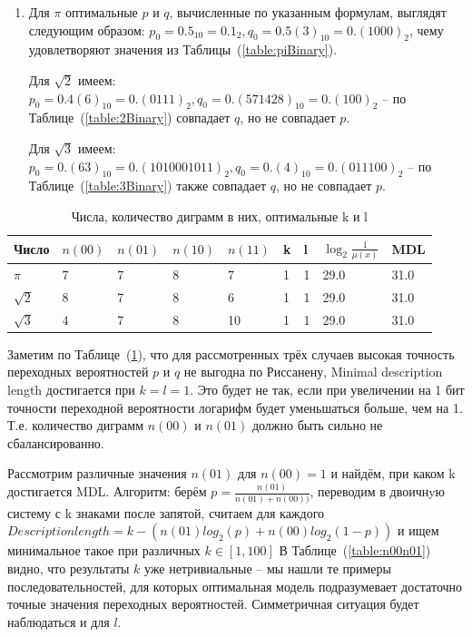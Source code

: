 \documentclass[12pt]{article}
\begin{document}
\begin{enumerate}
	
	
	\item Для $\pi$ оптимальные $p$ и $q$, вычисленные по указанным формулам, выглядят следующим образом: $p_0=0.5_{10} = 0.1_2, q_0=0.5(3)_{10}=0.(1000)_2$, чему удовлетворяют значения из Таблицы~(\ref{table:piBinary}). %
	
	Для $\sqrt{2}$ имеем: $p_0=0.4(6)_{10}=0.(0111)_2, q_0=0.(571428)_{10}=0.(100)_2$ -- по Таблице~(\ref{table:2Binary}) совпадает $q$, но не совпадает $p$.
	
	Для $\sqrt{3}$ имеем: $p_0=0.(63)_{10}=0.(1010001011)_2, q_0=0.(4)_{10}=0.(011100)_2$ -- по Таблице~(\ref{table:3Binary}) также совпадает $q$, но не совпадает $p$.
	\end{enumerate}
	
	\begin{table}[!h]
		\caption{Числа, количество диграмм в них, оптимальные k и l}
		\label{table:digramsPi23}
		\begin{center}
			\begin{tabular}{|l|l|l|l|l|l|l|l|l|}
			\hline
			Число & $n(00)$ & $n(01)$ & $n(10)$ & $n(11)$ & k & l & $\log_2{\frac{1}{\mu(x)}}$& MDL\\
			\hline
			$\pi$ & 7 & 7 & 8 & 7 & 1 & 1 & 29.0 & 31.0\\
			\hline
			$\sqrt{2}$ & 8 & 7 & 8 & 6 & 1 & 1 & 29.0 & 31.0\\
			\hline
			$\sqrt{3}$ & 4 & 7 & 8 & 10 & 1 & 1 & 29.0 & 31.0\\
			\hline
		\end{tabular}
	\end{center}
	\end{table}

	Заметим по Таблице~(\ref{table:digramsPi23}), что для рассмотренных трёх случаев высокая точность переходных вероятностей $p$ и $q$ не выгодна по Риссанену, Minimal description length достигается при $k=l=1$. Это будет не так, если при увеличении на 1 бит точности переходной вероятности логарифм будет уменьшаться больше, чем на 1. Т.е. количество диграмм $n(00)$ и $n(01)$ должно быть сильно не сбалансированно. %
	
	Рассмотрим различные значения $n(01)$ для $n(00)=1$ и найдём, при каком k достигается MDL. Алгоритм: берём $p = \frac{n(01)}{n(01)+n(00))}$, переводим в двоичнyю систему с k знаками после запятой, считаем для каждого $Description length = k - (n(01)log_2(p)+n(00)log_2(1-p))$ и ищем минимальное такое при различных $k\in[1,100]$ В Таблице~(\ref{table:n00n01}) видно, что результаты $k$ уже нетривиальные -- мы нашли те примеры последовательностей, для которых оптимальная модель подразумевает достаточно точные значения переходных вероятностей. Симметричная ситуация будет наблюдаться и для $l$.
	
\end{document}
